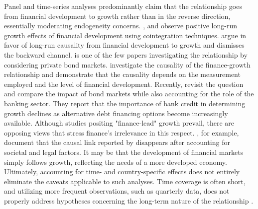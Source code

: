 \begin{refsection}
Panel and time-series analyses predominantly claim that the relationship goes from financial development to growth rather than in the reverse direction, essentially moderating endogeneity concerns.  \textcite{ChristopoulosTsionas2004}, \textcite{Finketal2003} and \textcite{PeiaRoszbach2015} observe positive long-run growth effects of financial development using cointegration techniques. \textcite{ChristopoulosTsionas2004} argue in favor of long-run causality from financial development to growth and dismisses the backward channel. \textcite{Finketal2003} is one of the few papers investigating the relationship by considering private bond markets. \textcite{PeiaRoszbach2015} investigate the causality of the finance-growth relationship and demonstrate that the causality depends on the measurement employed and the level of financial development. Recently, \textcite{Thumrongvitetal2013} revisit the question and compare the impact of bond markets while also accounting for the role of the banking sector. They report that the importance of bank credit in determining growth declines as alternative debt financing options become increasingly available. Although studies positing "finance-lead" growth prevail, there are opposing views that stress finance's irrelevance in this respect. \textcite{Garretsenetal2004}, for example, document that the causal link reported by \textcite{RajanZingales1998} disappears after accounting for societal and legal factors. It may be that the development of financial markets simply follows growth, reflecting the needs of a more developed economy. Ultimately, accounting for time- and country-specific effects does not entirely eliminate the caveats applicable to such analyses. Time coverage is often short, and utilizing more frequent observations, such as quarterly data, does not properly address hypotheses concerning the long-term nature of the relationship \parencite{Ang2008}. 


\end{refsection}
